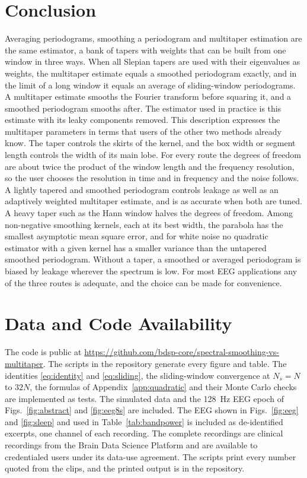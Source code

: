 \documentclass[10pt,twocolumn]{article}
\begin{document}
\section{Conclusion}
\label{sec:conclusion}
Averaging periodograms, smoothing a periodogram and multitaper estimation are the same estimator, a bank of tapers with weights that can be built from one window in three ways. When all Slepian tapers are used with their eigenvalues as weights, the multitaper estimate equals a smoothed periodogram exactly, and in the limit of a long window it equals an average of sliding-window periodograms. A multitaper estimate smooths the Fourier transform before squaring it, and a smoothed periodogram smooths after. The estimator used in practice is this estimate with its leaky components removed. This description expresses the multitaper parameters in terms that users of the other two methods already know. The taper controls the skirts of the kernel, and the box width or segment length controls the width of its main lobe. For every route the degrees of freedom are about twice the product of the window length and the frequency resolution, so the user chooses the resolution in time and in frequency and the noise follows. A lightly tapered and smoothed periodogram controls leakage as well as an adaptively weighted multitaper estimate, and is as accurate when both are tuned. A heavy taper such as the Hann window halves the degrees of freedom. Among non-negative smoothing kernels, each at its best width, the parabola has the smallest asymptotic mean square error, and for white noise no quadratic estimator with a given kernel has a smaller variance than the untapered smoothed periodogram. Without a taper, a smoothed or averaged periodogram is biased by leakage wherever the spectrum is low. For most EEG applications any of the three routes is adequate, and the choice can be made for convenience.


\section*{Data and Code Availability}
The code is public at \url{https://github.com/bdsp-core/spectral-smoothing-vs-multitaper}. The scripts in the repository generate every figure and table. The identities \eqref{eq:identity} and \eqref{eq:sliding}, the sliding-window convergence at $N_s=N$ to $32N$, the formulas of Appendix~\ref{app:quadratic} and their Monte Carlo checks are implemented as tests. The simulated data and the 128~Hz EEG epoch of Figs.~\ref{fig:abstract} and \ref{fig:eeg8s} are included. The EEG shown in Figs.~\ref{fig:eeg} and \ref{fig:sleep} and used in Table~\ref{tab:bandpower} is included as de-identified excerpts, one channel of each recording. The complete recordings are clinical recordings from the Brain Data Science Platform and are available to credentialed users under its data-use agreement. The scripts print every number quoted from the clips, and the printed output is in the repository.
\end{document}
